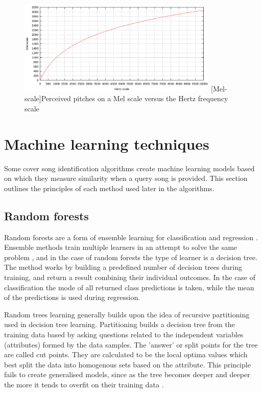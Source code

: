 \begin{figure}[H]
    \centering
    \includegraphics[width=0.85\textwidth]{BackgroundTheory/mel-scale.png}
    [Mel-scale]{Perceived pitches on a Mel scale versus the Hertz frequency scale \cite{wiki:melscale}}
    \label{fig:melscale}
\end{figure}

\section{Machine learning techniques}
\label{sec:machinelearning}
Some cover song identification algorithms create machine learning models based
on which they measure similarity when a query song is provided. This section
outlines the principles of each method used later in the algorithms.

\subsection{Random forests}
\label{subsec:randomforests}
Random forests are a form of ensemble learning for classification and regression
\cite{ho1995random}. Ensemble methods train multiple learners in an attempt to
solve the same problem \cite{zhou2012ensemble}, and in the case of random
forests the type of learner is a decision tree. The method works by building a
predefined number of decision trees during training, and return a result
combining their individual outcomes. In the case of classification the mode of
all returned class predictions is taken, while the mean of the predictions is
used during regression. 

Random trees learning generally builds upon the idea of recursive partitioning
used in decision tree learning. Partitioning builds a decision tree from the
training data based by asking questions related to the independent variables
(attributes) formed by the data samples. The 'answer' or split points for the
tree are called cut points. They are calculated to be the local optima values
which best split the data into homogenous sets based on the attribute. This
principle fails to create generalised models, since as the tree becomes deeper
and deeper the more it tends to overfit on their training data
\cite{friedman2001elements}.

